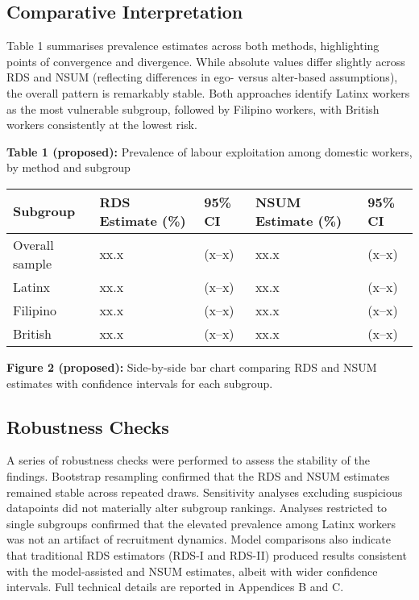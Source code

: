\documentclass[
  12pt,
  letterpaper,
  DIV=11,
  numbers=noendperiod]{scrartcl}
\theoremstyle{plain}
\theoremstyle{definition}
\begin{document}
\subsection{Comparative
Interpretation}\label{comparative-interpretation}

Table 1 summarises prevalence estimates across both methods,
highlighting points of convergence and divergence. While absolute values
differ slightly across RDS and NSUM (reflecting differences in ego-
versus alter-based assumptions), the overall pattern is remarkably
stable. Both approaches identify Latinx workers as the most vulnerable
subgroup, followed by Filipino workers, with British workers
consistently at the lowest risk.

\textbf{Table 1 (proposed):} Prevalence of labour exploitation among
domestic workers, by method and subgroup

\begin{longtable}[]{@{}lllll@{}}
\toprule\noalign{}
Subgroup & RDS Estimate (\%) & 95\% CI & NSUM Estimate (\%) & 95\% CI \\
\midrule\noalign{}
\endhead
\bottomrule\noalign{}
\endlastfoot
Overall sample & xx.x & (x--x) & xx.x & (x--x) \\
Latinx & xx.x & (x--x) & xx.x & (x--x) \\
Filipino & xx.x & (x--x) & xx.x & (x--x) \\
British & xx.x & (x--x) & xx.x & (x--x) \\
\end{longtable}

\textbf{Figure 2 (proposed):} Side-by-side bar chart comparing RDS and
NSUM estimates with confidence intervals for each subgroup.

\subsection{Robustness Checks}\label{robustness-checks}

A series of robustness checks were performed to assess the stability of
the findings. Bootstrap resampling confirmed that the RDS and NSUM
estimates remained stable across repeated draws. Sensitivity analyses
excluding suspicious datapoints did not materially alter subgroup
rankings. Analyses restricted to single subgroups confirmed that the
elevated prevalence among Latinx workers was not an artifact of
recruitment dynamics. Model comparisons also indicate that traditional
RDS estimators (RDS-I and RDS-II) produced results consistent with the
model-assisted and NSUM estimates, albeit with wider confidence
intervals. Full technical details are reported in Appendices B and C.
\end{document}
